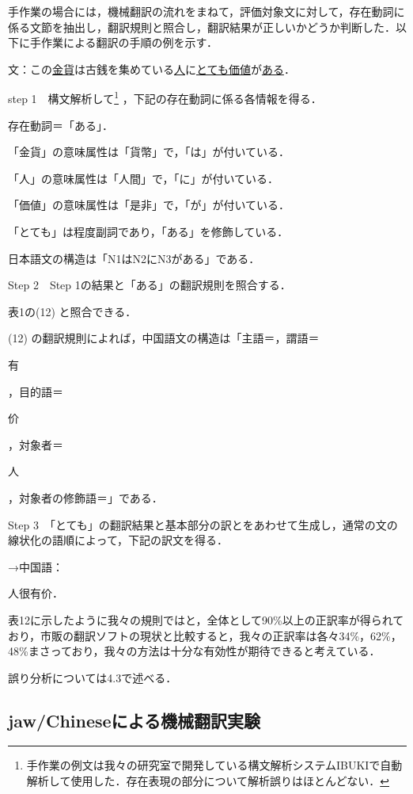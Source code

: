 \documentclass[japanese]{jnlp_1.4}
\begin{document}
手作業の場合には，機械翻訳の流れをまねて，評価対象文に対して，存在動詞に係る文節を抽出し，翻訳規則と照合し，翻訳結果が正しいかどうか判断した．以下に手作業による翻訳の手順の例を示す．

文：この\ul{金貨}は古銭を集めている\ul{人}に\ul{とても価値}が\ul{ある}．

step 1　構文解析して\footnote{
	手作業の例文は我々の研究室で開発している構文解析システムIBUKIで自動解析して使用した．存在表現の部分について解析誤りはほとんどない．}
，下記の存在動詞に係る各情報を得る．

存在動詞＝「ある」．

「金貨」の意味属性は「貨幣」で，「は」が付いている．

「人」の意味属性は「人間」で，「に」が付いている．

「価値」の意味属性は「是非」で，「が」が付いている．

「とても」は程度副詞であり，「ある」を修飾している．

日本語文の構造は「N1はN2にN3がある」である．

Step 2　Step 1の結果と「ある」の翻訳規則を照合する．

表1の(12) と照合できる．

(12) の翻訳規則によれば，中国語文の構造は「主語＝，謂語＝\begin{簡体中文}有\end{簡体中文}，目的語＝\begin{簡体中文}价\end{簡体中文}，対象者＝\begin{簡体中文}人\end{簡体中文}，対象者の修飾語＝」である．

Step 3　「とても」の翻訳結果と基本部分の訳とをあわせて生成し，通常の文の線状化の語順によって，下記の訳文を得る．

→中国語：\begin{簡体中文}人很有价．\end{簡体中文}

表12に示したように我々の規則ではと，全体として90\%以上の正訳率が得られており，市販の翻訳ソフトの現状と比較すると，我々の正訳率は各々34\%，62\%，48\%まさっており，我々の方法は十分な有効性が期待できると考えている．

誤り分析については4.3で述べる．



\subsection{jaw/Chineseによる機械翻訳実験}
\end{document}

